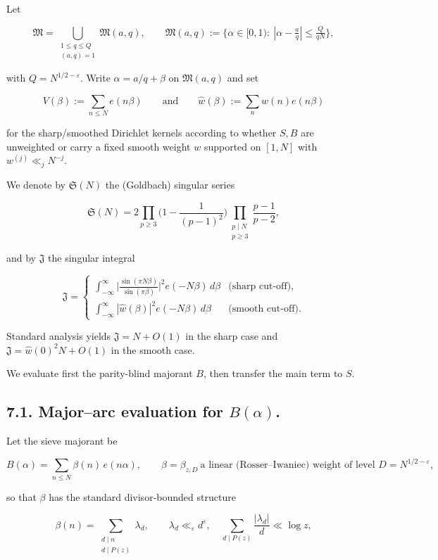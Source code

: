 \documentclass[11pt]{article}
\theoremstyle{definition}
\theoremstyle{remark}
\begin{document}
Let

$$
\mathfrak M=\bigcup_{\substack{1\le q\le Q\\(a,q)=1}}\mathfrak M(a,q),\qquad 
\mathfrak M(a,q):=\{\alpha\in[0,1):\ |\alpha-\tfrac aq|\le \tfrac{Q}{qN}\},
$$

with $Q=N^{1/2-\varepsilon}$. Write $\alpha=a/q+\beta$ on $\mathfrak M(a,q)$ and set

$$
V(\beta):=\sum_{n\le N}e(n\beta) \qquad\text{and}\qquad \widehat w(\beta):=\sum_{n}w(n)e(n\beta)
$$

for the sharp/smoothed Dirichlet kernels according to whether $S, B$ are unweighted or carry a fixed smooth weight $w$ supported on $[1,N]$ with $w^{(j)}\ll_j N^{-j}$.

We denote by $\mathfrak S(N)$ the (Goldbach) singular series

$$
\mathfrak S(N)=2\prod_{p\ge 3}\Big(1-\frac1{(p-1)^2}\Big)
\prod_{\substack{p\mid N\\ p\ge 3}}\frac{p-1}{p-2},
$$

and by $\mathfrak J$ the singular integral

$$
\mathfrak J=
\begin{cases}
\displaystyle \int_{-\infty}^{\infty}\Big|\frac{\sin(\pi N\beta)}{\sin(\pi\beta)}\Big|^{\!2}e(-N\beta)\,d\beta
&\text{(sharp cut-off)},\\[2ex]
\displaystyle \int_{-\infty}^{\infty}|\widehat w(\beta)|^{2}e(-N\beta)\,d\beta
&\text{(smooth cut-off)}.
\end{cases}
$$

Standard analysis yields $\mathfrak J=N+O(1)$ in the sharp case and $\mathfrak J=\widehat w(0)^2 N+O(1)$ in the smooth case.

We evaluate first the parity-blind majorant $B$, then transfer the main term to $S$.

\subsection*{7.1. Major–arc evaluation for $B(\alpha)$.}

Let the sieve majorant be

$$
B(\alpha)=\sum_{n\le N}\beta(n)\,e(n\alpha),\qquad 
\beta=\beta_{z,D}\ \text{a linear (Rosser–Iwaniec) weight of level }D=N^{1/2-\varepsilon},
$$

so that $\beta$ has the standard divisor-bounded structure

$$
\beta(n)=\sum_{\substack{d\mid n\\ d\mid P(z)}}\lambda_d,\qquad 
\lambda_d\ll_\varepsilon d^\varepsilon,\quad \sum_{d\mid P(z)}\frac{|\lambda_d|}{d}\ll \log z,
$$
\end{document}

